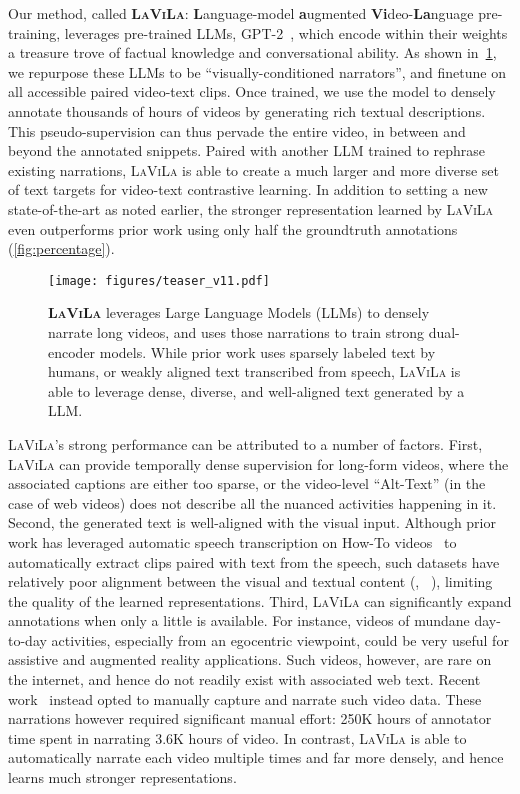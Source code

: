 \documentclass[10pt,twocolumn,letterpaper]{article}
\newcommand{\ours}{\textsc{LaViLa}\xspace}
\begin{document}
Our method, called {\bf \ours}:
{\bf L}anguage-model {\bf a}ugmented {\bf Vi}deo-{\bf La}nguage pre-training,
leverages pre-trained LLMs, \eg GPT-2~\cite{radford2019gpt2},
which encode within their weights a treasure trove of factual knowledge and conversational ability.
As shown in~\cref{fig:teaser}, we repurpose these LLMs to be ``visually-conditioned narrators'', and finetune on all accessible paired video-text clips. Once trained,
we use the model to densely annotate thousands of hours of videos by generating rich textual descriptions.
This pseudo-supervision can thus pervade the entire video, in between and beyond the annotated snippets.
Paired with another LLM trained to rephrase existing narrations, \ours is able to create a much larger and more diverse set of text targets for video-text contrastive learning.
In addition to setting a new state-of-the-art as noted earlier, the stronger representation learned by \ours
even outperforms prior work using only half the groundtruth annotations (\cref{fig:percentage}).


\begin{figure}[t]
	\begin{center}
		\centering
		\texttt{[image: figures/teaser\_v11.pdf]}
		\caption{
			{\bf \ours} leverages Large Language Models (LLMs) to densely narrate long videos, and uses those narrations to train strong dual-encoder models. While prior work uses sparsely labeled text by humans, or weakly aligned text transcribed from speech, \ours is able to leverage dense, diverse, and well-aligned text generated by a LLM.
		}
		\label{fig:teaser}
	\end{center}
\end{figure}


\ours's strong performance can be attributed to a number of factors.
First, \ours can provide temporally dense supervision for long-form videos, where the associated captions are either too sparse, or the video-level ``Alt-Text'' (in the case of web videos) does not describe all the nuanced activities happening in it.
Second, the generated text is well-aligned with the visual input.
Although prior work has leveraged automatic speech transcription on How-To videos~\cite{miech2019howto100m} to automatically extract clips paired with text from the speech, such datasets have relatively poor alignment between the visual and textual content (, \cf~\cite{miech2019howto100m,han2022tan}), limiting the quality of the learned representations.
Third, \ours can significantly expand annotations when only a little is available.
For instance, videos of mundane day-to-day activities, especially from an egocentric viewpoint, could be very useful for assistive and augmented reality applications.
Such videos, however, are rare on the internet, and hence do not readily exist with associated web text. Recent work~\cite{grauman2022ego4d} instead opted to manually capture and narrate such video data.
These narrations however required significant manual effort: 250K hours of annotator time spent in narrating 3.6K hours of video.
In contrast, \ours is able to automatically narrate each video multiple times and far more densely, and hence learns much stronger representations.
\end{document}
